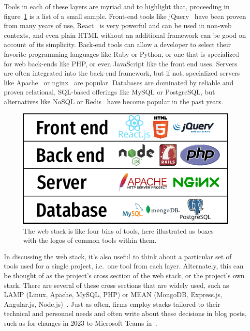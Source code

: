 \documentclass[english,12pt,a4paper,pdftex,eng,utf8]{aaltothesis}
\begin{document}
Tools in each of these layers are myriad and to highlight that, proceeding in figure~\ref{fig:web_stack} is a list of a small sample. Front-end tools like jQuery~\cite{jQuery} have been proven from many years of use, React~\cite{React} is very powerful and can be used in non-web contexts, and even plain HTML without an additional framework can be good on account of its simplicity. Back-end tools can allow a developer to select their favorite programming languages like Ruby or Python, or one that is specialized for web back-ends like PHP, or even JavaScript like the front end uses. Servers are often integrated into the back-end framework, but if not, specialized servers like Apache~\cite{ApacheServer} or nginx~\cite{nginx} are popular. Databases are dominated by reliable and proven relational, SQL-based offerings like MySQL or PostgreSQL, but alternatives like NoSQL or Redis~\cite{redis} have become popular in the past years.

\begin{figure}[h]
  \centering
  \includegraphics[width=\textwidth]{assets/web_stack}
  \caption{The web stack is like four bins of tools, here illustrated as boxes with the logos of common tools within them.}\label{fig:web_stack}
\end{figure}

In discussing the web stack, it's also useful to think about a particular set of tools used for a single project, i.e.\ one tool from each layer. Alternately, this can be thought of as the project's cross section of the web stack, or the project's own stack. There are several of these cross sections that are widely used, such as LAMP (Linux, Apache, MySQL, PHP) or MEAN (MongoDB, Express.js, Angular.js, Node.js)~\cite{PranamStack2017}. Just as often, firms employ stacks tailored to their technical and personnel needs and often write about these decisions in blog posts, such as for changes in 2023 to Microsoft Teams in~\cite{Singh2023}.
\end{document}
